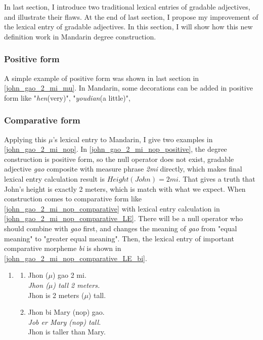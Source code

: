 \documentclass{ctexart}
\begin{document}
In last section, I introduce two traditional lexical entries of gradable adjectives, and illustrate their flaws. At the end of last section, I propose my improvement of the lexical entry of gradable adjectives. In this section, I will show how this new definition work in Mandarin degree construction.

\subsubsection{Positive form}

A simple example of positive form was shown in last section in \ref{john_gao_2_mi_mu}. In Mandarin, some decorations can be added in positive form like "\textit{hen}(very)", "\textit{youdian}(a little)", 


\subsubsection{Comparative form}


Applying this $\mu$'s lexical entry to Mandarin, I give two examples in \ref{john_gao_2_mi_nop}. In \ref{john_gao_2_mi_nop_positive}, the degree construction is positive form, so the null operator does not exist, gradable adjective \textit{gao} composite with measure phrase \textit{2mi} directly, which makes final lexical entry calculation result is $Height(John)=2mi$. That gives a truth that John's height is exactly 2 meters, which is match with what we expect. When construction comes to comparative form like \ref{john_gao_2_mi_nop_comparative} with lexical entry calculation in \ref{john_gao_2_mi_nop_comparative_LE}. There will be a null operator who should combine with \textit{gao} first, and changes the meaning of \textit{gao} from "equal meaning" to "greater equal meaning". Then, the lexical entry of important comparative morpheme \textit{bi} is shown in \ref{john_gao_2_mi_nop_comparative_LE_bi}.

\begin{enumerate}[resume]
    \item \label{john_gao_2_mi_nop}
    
    \begin{enumerate}[ref=(\arabic{enumi}\alph*)]
        \item \label{john_gao_2_mi_nop_positive}
        Jhon ($\mu$) gao 2 mi.  \\
        \textit{Jhon ($\mu$) tall 2 meters.}    \\
        Jhon is 2 meters ($\mu$) tall.

        \item \label{john_gao_2_mi_nop_comparative}
        Jhon bi Mary (nop) gao. \\  
        \textit{Job er Mary (nop) tall.}    \\
        Jhon is taller than Mary.

    \end{enumerate}
    
\end{enumerate}
\end{document}
